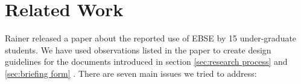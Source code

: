 
\section{Related Work}
\label{sec:related work}

Rainer \etal \cite{Rainer2006} released a paper about the reported use of EBSE by 15 under-graduate students. 
We have used observations listed in the paper to create design guidelines for the documents introduced in section \ref{sec:research process} and \ref{sec:briefing form} . There are seven main issues we tried to address:



\\
 \cite{Rainer2008}